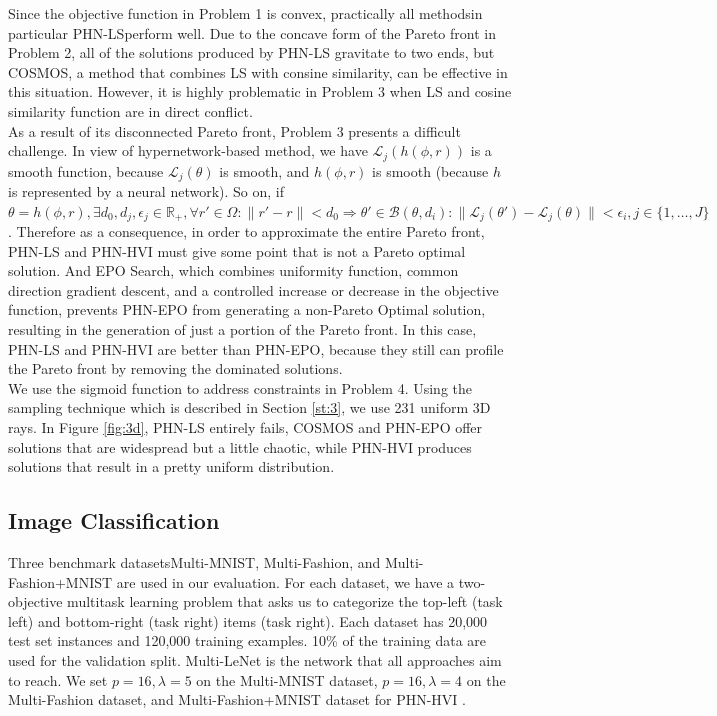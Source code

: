 \documentclass[letterpaper]{article} %
\newcommand{\ourmodel}{PHN-HVI }
\begin{document}
Since the objective function in Problem 1 is convex, practically all methodsin particular PHN-LSperform well. Due to the concave form of the Pareto front in Problem 2, all of the solutions produced by PHN-LS gravitate to two ends, but COSMOS, a method that combines LS with consine similarity, can be effective in this situation. However, it is highly problematic in Problem 3 when LS and cosine similarity function are in direct conflict. \\
As a result of its disconnected Pareto front, Problem 3 presents a difficult challenge. In view of hypernetwork-based method, we have $\mathcal{L}_j(h(\phi, r))$ is a smooth function, because $\mathcal{L}_j(\theta)$ is smooth, and $h(\phi, r)$ is smooth (because $h$ is represented by a neural network). So on, if $\theta = h(\phi, r), \exists d_0, d_j, \epsilon_j \in \mathbb{R}_+, \forall r' \in \Omega: \|r' -r\| < d_0 \Rightarrow \theta' \in \mathcal{B}(\theta, d_i): \|\mathcal{L}_j(\theta') -\mathcal{L}_j(\theta)\| < \epsilon_i, j\in\{1,\dots, J\}$. Therefore as a consequence, in order to approximate the entire Pareto front, PHN-LS and \ourmodel must give some point that is not a Pareto optimal solution. And EPO Search, which combines uniformity function, common direction gradient descent, and a controlled increase or decrease in the objective function, prevents PHN-EPO from generating a non-Pareto Optimal solution, resulting in the generation of just a portion of the Pareto front. In this case, PHN-LS and \ourmodel are better than PHN-EPO, because they still can profile the Pareto front by removing the dominated solutions.\\
\indent We use the sigmoid function to address constraints in Problem 4. Using the sampling technique which is described in Section \ref{st:3}, we use 231 uniform 3D rays. In Figure \ref{fig:3d}, PHN-LS entirely fails, COSMOS and PHN-EPO offer solutions that are widespread but a little chaotic, while \ourmodel produces solutions that result in a pretty uniform distribution.


\subsection{Image Classification}
Three benchmark datasetsMulti-MNIST, Multi-Fashion, and Multi-Fashion+MNIST \cite{lin2019pareto} are used in our evaluation. For each dataset, we have a two-objective multitask learning problem that asks us to categorize the top-left (task left) and bottom-right (task right) items (task right). Each dataset has 20,000 test set instances and 120,000 training examples. 10\% of the training data are used for the validation split. Multi-LeNet \cite{sener2019multitask} is the network that all approaches aim to reach. We set $p=16, \lambda=5$ on the Multi-MNIST dataset, $p=16, \lambda=4$ on the Multi-Fashion dataset, and Multi-Fashion+MNIST dataset for \ourmodel.
\end{document}
